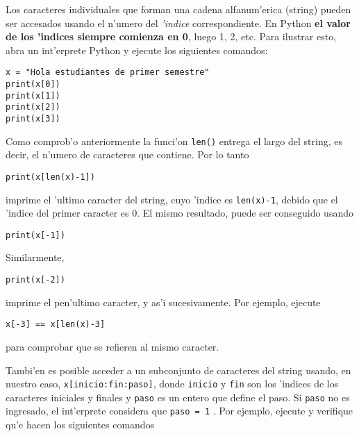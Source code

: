 \documentclass[11pt]{exam}
\begin{document}
\begin{questions}
\item Los caracteres individuales que forman una cadena alfanum'erica (string) pueden ser accesados usando el n'umero del \textit{'indice} correspondiente. En Python \textbf{el valor de los 'indices siempre comienza en 0}, luego 1, 2, etc. Para ilustrar esto, abra un int'erprete Python y ejecute los siguientes comandos:

\begin{verbatim}
x = "Hola estudiantes de primer semestre"
print(x[0])
print(x[1])
print(x[2])
print(x[3])
\end{verbatim}

\item Como comprob'o anteriormente la funci'on \texttt{len()} entrega el largo del string, es decir, el n'umero de caracteres que contiene. Por lo tanto

\begin{verbatim}
print(x[len(x)-1])
\end{verbatim}

imprime el 'ultimo caracter del string, cuyo 'indice es \texttt{len(x)-1}, debido que el 'indice del primer caracter es 0. El mismo resultado, puede ser conseguido usando

\begin{verbatim}
print(x[-1])
\end{verbatim}

Similarmente,

\begin{verbatim}
print(x[-2])
\end{verbatim}

imprime el pen'ultimo caracter, y as'i sucesivamente. Por ejemplo, ejecute

\begin{verbatim}
x[-3] == x[len(x)-3]
\end{verbatim}

para comprobar que se refieren al mismo caracter.

\item Tambi'en es posible acceder a un subconjunto de caracteres del string usando, en nuestro caso, \texttt{x[inicio:fin:paso]}, donde \texttt{inicio} y \texttt{fin} son los 'indices de los caracteres iniciales y finales y \texttt{paso} es un entero que define el paso. Si \texttt{paso} no es ingresado, el int'erprete considera que \texttt{paso = 1} . Por ejemplo, ejecute y verifique qu'e hacen los siguientes comandos


\end{questions}
\end{document}
